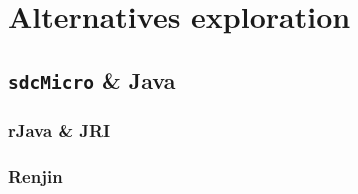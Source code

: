 \section{Alternatives exploration}
\label{Implementation:Alternatives}

\subsection{\texttt{sdcMicro} \& Java}
\label{Implementation:Alternatives:sdcmicro}

\subsubsection{rJava \& JRI}

\subsubsection{Renjin}
